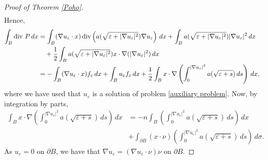 \documentclass[leqno,twoside, 12pt]{amsart}
\theoremstyle{plain}
\numberwithin{equation}{section} \numberwithin{figure}{section}
\theoremstyle{definition}
\numberwithin{equation}{section}
\def\diver{\mathop{\text{\normalfont div}}}
\begin{document}
\begin{proof}[Proof of Theorem \ref{Poho}]
\begin{equation}
\begin{split}
\end{split}
\end{equation}Hence, 
\begin{equation}\label{int0}
\begin{split}
\int_B \text{div } P\,dx & = \int_B (\nabla u_\varepsilon \cdot x)\diver\left( a(\sqrt{\varepsilon+|\nabla u_\varepsilon|^2})\nabla u_{\varepsilon}\right) \,dx + \int_B  a(\sqrt{\varepsilon+|\nabla u_\varepsilon|^2})|\nabla u_\varepsilon|^2\,dx\\ & \quad + \dfrac{1}{2}\int_B  a(\sqrt{\varepsilon+|\nabla u_\varepsilon|^2}) x\cdot \nabla (|\nabla u_\varepsilon|^2)\,dx \\& = -\int_B (\nabla u_\varepsilon \cdot x)f_\varepsilon \,dx + \int_B u_\varepsilon f_\varepsilon\,dx + \dfrac{1}{2}\int_B x\cdot \nabla \left(\int_0^{|\nabla u_\varepsilon|^2}a(\sqrt{\varepsilon + s})\,ds \right)\,dx,
\end{split}
\end{equation}where we have used that $u_\varepsilon$ is a solution of problem \eqref{auxiliary problem}. Now, by integration by parts,
\begin{equation}\label{in1}
\begin{split}
\int_B x\cdot \nabla \left(\int_0^{|\nabla u_\varepsilon|^2}a(\sqrt{\varepsilon + s})\,ds \right)\,dx & = -n\int_B\left(\int_0^{|\nabla u_\varepsilon|^2}a(\sqrt{\varepsilon + s})\,ds \right)\,dx \\& +\int_{\partial B}(x\cdot \nu) \left(\int_0^{|\nabla u_\varepsilon|^2}a(\sqrt{\varepsilon + s})\,ds \right)\,d\sigma.
\end{split}
\end{equation}As $u_\varepsilon=0$ on $\partial B$, we have that $\nabla u_\varepsilon=(\nabla u_\varepsilon \cdot \nu)\nu$ on $\partial B$. 


\end{proof}
\end{document}
